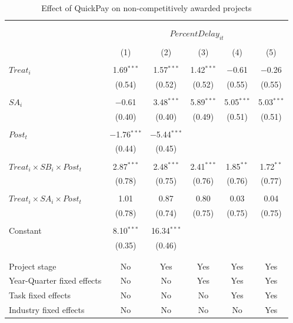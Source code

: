 \documentclass[
]{article}
\begin{document}
\begin{table}[H] \centering 
  \caption{Effect of QuickPay on non-competitively awarded projects} 
  \label{} 
\small 
\begin{tabular}{@{\extracolsep{-2pt}}lccccc} 
\\[-1.8ex]\hline 
\hline \\[-1.8ex] 
\\[-1.8ex] & \multicolumn{5}{c}{$PercentDelay_{it}$  } \\ 
\\[-1.8ex] & (1) & (2) & (3) & (4) & (5)\\ 
\hline \\[-1.8ex] 
 $Treat_i$ & 1.69$^{***}$ & 1.57$^{***}$ & 1.42$^{***}$ & $-$0.61 & $-$0.26 \\ 
  & (0.54) & (0.52) & (0.52) & (0.55) & (0.55) \\ 
  & & & & & \\ 
 $SA_i$ & $-$0.61 & 3.48$^{***}$ & 5.89$^{***}$ & 5.05$^{***}$ & 5.03$^{***}$ \\ 
  & (0.40) & (0.40) & (0.49) & (0.51) & (0.51) \\ 
  & & & & & \\ 
 $Post_t$ & $-$1.76$^{***}$ & $-$5.44$^{***}$ &  &  &  \\ 
  & (0.44) & (0.45) &  &  &  \\ 
  & & & & & \\ 
 $Treat_i \times SB_i \times Post_t$ & 2.87$^{***}$ & 2.48$^{***}$ & 2.41$^{***}$ & 1.85$^{**}$ & 1.72$^{**}$ \\ 
  & (0.78) & (0.75) & (0.76) & (0.76) & (0.77) \\ 
  & & & & & \\ 
 $Treat_i \times SA_i \times Post_t$ & 1.01 & 0.87 & 0.80 & 0.03 & 0.04 \\ 
  & (0.78) & (0.74) & (0.75) & (0.75) & (0.75) \\ 
  & & & & & \\ 
 Constant & 8.10$^{***}$ & 16.34$^{***}$ &  &  &  \\ 
  & (0.35) & (0.46) &  &  &  \\ 
  & & & & & \\ 
\hline \\[-1.8ex] 
Project stage & No & Yes & Yes & Yes & Yes \\ 
Year-Quarter fixed effects & No & No & Yes & Yes & Yes \\ 
Task fixed effects & No & No & No & Yes & Yes \\ 
Industry fixed effects & No & No & No & No & Yes \\ 

\end{tabular}
\end{table}
\end{document}
